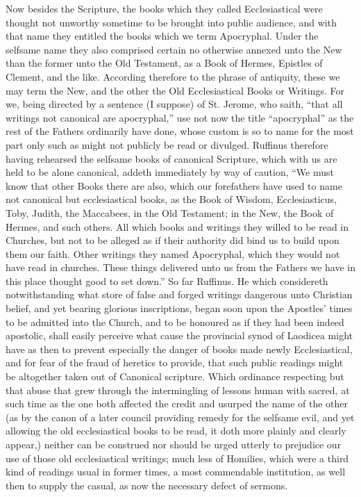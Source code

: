 Now besides the Scripture, the books which they called Ecclesiastical were thought not unworthy sometime to be brought into public audience, and with that name they entitled the books which we term Apocryphal. Under the selfsame name they also comprised certain no otherwise annexed unto the New than the former unto the Old Testament, as a Book of Hermes, Epistles of Clement, and the like. According therefore to the phrase of antiquity, these we may term the New, and the other the Old Ecclesiastical Books or Writings. For we, being directed by a sentence (I suppose) of St. Jerome, who saith, “that all writings not canonical are apocryphal,” use not now the title “apocryphal” as the rest of the Fathers ordinarily have done, whose custom is so to name for the most part only such as might not publicly be read or divulged. Ruffinus therefore having rehearsed the selfsame books of canonical Scripture, which with us are held to be alone canonical, addeth immediately by way of caution, “We must know that other Books there are also, which our forefathers have used to name not canonical but ecclesiastical books, as the Book of Wisdom, Ecclesiasticus, Toby, Judith, the Maccabees, in the Old Testament; in the New, the Book of Hermes, and such others. All which books and writings  they willed to be read in Churches, but not to be alleged as if their authority did bind us to build upon them our faith. Other writings they named Apocryphal, which they would not have read in churches. These things delivered unto us from the Fathers we have in this place thought good to set down.” So far Ruffinus.
He which considereth notwithstanding what store of false and forged writings dangerous unto Christian belief, and yet bearing glorious inscriptions, began soon upon the Apostles’ times to be admitted into the Church, and to be honoured as if they had been indeed apostolic, shall easily perceive what cause the provincial synod of Laodicea might have as then to prevent especially the danger of books made newly Ecclesiastical, and for fear of the fraud of heretics to provide, that such public readings might be altogether taken out of Canonical scripture. Which ordinance respecting but that abuse that grew through the intermingling of lessons human with sacred, at such time as the one both affected the credit and usurped the name of the other (as by the canon of a later council providing remedy for the selfsame evil, and yet allowing the old ecclesiastical books to be read, it doth more plainly and clearly appear,) neither can be construed nor should be urged utterly to prejudice our use of those old ecclesiastical writings; much less of Homilies, which were a third kind of readings usual in former times, a most commendable  institution, as well then to supply the casual, as now the necessary defect of sermons.
